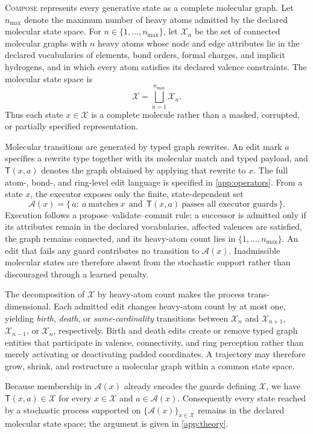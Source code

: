 \documentclass{article}
\theoremstyle{definition}
\theoremstyle{remark}
\newcommand{\method}{\textsc{Compose}\xspace}
\newcommand{\X}{\mathcal{X}}
\newcommand{\A}{\mathcal{A}}
\newcommand{\T}{\mathsf{T}}
\begin{document}
\method{} represents every generative state as a complete molecular graph. Let $n_{\max}$ denote the maximum number of heavy atoms admitted by the declared molecular state space. For $n\in\{1,\dots,n_{\max}\}$, let $\X_n$ be the set of connected molecular graphs with $n$ heavy atoms whose node and edge attributes lie in the declared vocabularies of elements, bond orders, formal charges, and implicit hydrogens, and in which every atom satisfies its declared valence constraints. The molecular state space is
\begin{equation}
\X=\bigsqcup_{n=1}^{n_{\max}}\X_n.
\label{eq:statespace}
\end{equation}
Thus each state $x\in\X$ is a complete molecule rather than a masked, corrupted, or partially specified representation.

Molecular transitions are generated by typed graph rewrites. An edit mark $a$ specifies a rewrite type together with its molecular match and typed payload, and $\T(x,a)$ denotes the graph obtained by applying that rewrite to $x$. The full atom-, bond-, and ring-level edit language is specified in \cref{app:operators}. From a state $x$, the executor exposes only the finite, state-dependent set
\begin{equation}
\A(x)=\bigl\{\,a:\ a\ \text{matches}\ x\ \ \text{and}\ \ \T(x,a)\ \text{passes all executor guards}\,\bigr\}.
\label{eq:editset}
\end{equation}
Execution follows a propose--validate--commit rule: a successor is admitted only if its attributes remain in the declared vocabularies, affected valences are satisfied, the graph remains connected, and its heavy-atom count lies in $\{1,\dots,n_{\max}\}$. An edit that fails any guard contributes no transition to $\A(x)$. Inadmissible molecular states are therefore absent from the stochastic support rather than discouraged through a learned penalty.

The decomposition of $\X$ by heavy-atom count makes the process trans-dimensional. Each admitted edit changes heavy-atom count by at most one, yielding \emph{birth}, \emph{death}, or \emph{same-cardinality} transitions between $\X_n$ and $\X_{n+1}$, $\X_{n-1}$, or $\X_n$, respectively. Birth and death edits create or remove typed graph entities that participate in valence, connectivity, and ring perception rather than merely activating or deactivating padded coordinates. A trajectory may therefore grow, shrink, and restructure a molecular graph within a common state space.

Because membership in $\A(x)$ already encodes the guards defining $\X$, we have $\T(x,a)\in\X$ for every $x\in\X$ and $a\in\A(x)$\label{prop:closure}. Consequently every state reached by a stochastic process supported on $\{\A(x)\}_{x\in\X}$ remains in the declared molecular state space; the argument is given in \cref{app:theory}.
\end{document}
